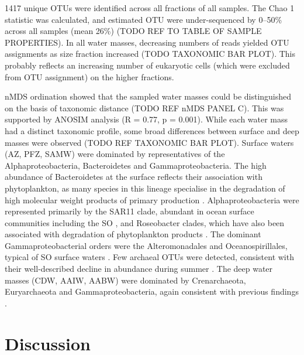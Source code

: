 1417 unique \acp{OTU} were identified across all fractions of all samples.
The Chao 1 statistic was calculated, and estimated \ac{OTU} were under-sequenced by 0--50\% across all samples (mean 26\%) (TODO REF TO TABLE OF SAMPLE PROPERTIES).
In all water masses, decreasing numbers of reads yielded \ac{OTU} assignments as size fraction increased (TODO TAXONOMIC BAR PLOT).
This probably reflects an increasing number of eukaryotic cells (which were excluded from \ac{OTU} assignment) on the higher fractions.

\ac{nMDS} ordination showed that the sampled water masses could be distinguished on the basis of taxonomic distance (TODO REF nMDS PANEL C).
This was supported by \ac{ANOSIM} analysis (R = 0.77, p = 0.001).
While each water mass had a distinct taxonomic profile, some broad differences between surface and deep masses were observed (TODO REF TAXONOMIC BAR PLOT).
Surface waters (\ac{AZ}, \ac{PFZ}, \ac{SAMW}) were dominated by representatives of the Alphaproteobacteria, Bacteroidetes and Gammaproteobacteria.
The high abundance of Bacteroidetes at the surface reflects their association with phytoplankton, as many species in this lineage specialise in the degradation of high molecular weight products of primary production \cite{Williams:2012gs}.
Alphaproteobacteria were represented primarily by the SAR11 clade, abundant in ocean surface communities \cite{Morris:2002bn} including the \ac{SO} \cite{Brown:2012gn}, and Roseobacter clades, which have also been associated with degradation of phytoplankton products \cite{Williams:2012gs, Giebel:2009hr}.
The dominant Gammaproteobacterial orders were the Alteromonadales and Oceanospirillales, typical of \ac{SO} surface waters \cite{Wilkins:2012ii}.
Few archaeal \acp{OTU} were detected, consistent with their well-described decline in abundance during summer \cite{Murray:1998wy, Grzymski:2012ej}.
The deep water masses (\ac{CDW}, \ac{AAIW}, \ac{AABW}) were dominated by Crenarchaeota, Euryarchaeota and Gammaproteobacteria, again consistent with previous findings \cite{LopezGarcia:2001vp}.


\section{Discussion}
